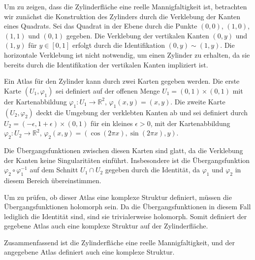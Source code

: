 Um zu zeigen, dass die Zylinderfläche eine reelle Mannigfaltigkeit ist, betrachten wir zunächst die Konstruktion des Zylinders durch die Verklebung der Kanten eines Quadrats. Sei das Quadrat in der Ebene durch die Punkte \((0,0)\), \((1,0)\), \((1,1)\) und \((0,1)\) gegeben. Die Verklebung der vertikalen Kanten \((0,y)\) und \((1,y)\) für \(y \in [0,1]\) erfolgt durch die Identifikation \((0,y) \sim (1,y)\). Die horizontale Verklebung ist nicht notwendig, um einen Zylinder zu erhalten, da sie bereits durch die Identifikation der vertikalen Kanten impliziert ist.

Ein Atlas für den Zylinder kann durch zwei Karten gegeben werden. Die erste Karte \((U_1, \varphi_1)\) sei definiert auf der offenen Menge \(U_1 = (0,1) \times (0,1)\) mit der Kartenabbildung \(\varphi_1: U_1 \to \mathbb{R}^2\), \(\varphi_1(x,y) = (x,y)\). Die zweite Karte \((U_2, \varphi_2)\) deckt die Umgebung der verklebten Kanten ab und sei definiert durch \(U_2 = (-\epsilon, 1+\epsilon) \times (0,1)\) für ein kleines \(\epsilon > 0\), mit der Kartenabbildung \(\varphi_2: U_2 \to \mathbb{R}^2\), \(\varphi_2(x,y) = (\cos(2\pi x), \sin(2\pi x), y)\).

Die Übergangsfunktionen zwischen diesen Karten sind glatt, da die Verklebung der Kanten keine Singularitäten einführt. Insbesondere ist die Übergangsfunktion \(\varphi_2 \circ \varphi_1^{-1}\) auf dem Schnitt \(U_1 \cap U_2\) gegeben durch die Identität, da \(\varphi_1\) und \(\varphi_2\) in diesem Bereich übereinstimmen.

Um zu prüfen, ob dieser Atlas eine komplexe Struktur definiert, müssen die Übergangsfunktionen holomorph sein. Da die Übergangsfunktionen in diesem Fall lediglich die Identität sind, sind sie trivialerweise holomorph. Somit definiert der gegebene Atlas auch eine komplexe Struktur auf der Zylinderfläche.

Zusammenfassend ist die Zylinderfläche eine reelle Mannigfaltigkeit, und der angegebene Atlas definiert auch eine komplexe Struktur.